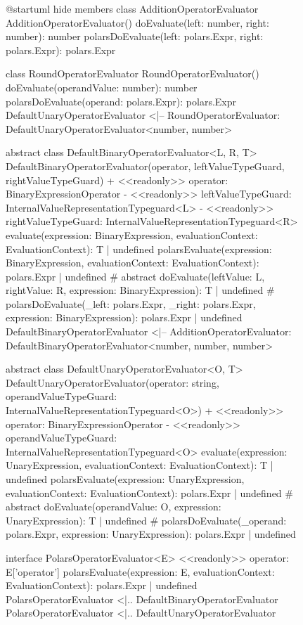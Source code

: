 \begin{figure}
	\begin{plantuml}
		@startuml
		hide members
		class AdditionOperatorEvaluator {
				AdditionOperatorEvaluator()
				doEvaluate(left: number, right: number): number
				polarsDoEvaluate(left: polars.Expr, right: polars.Expr): polars.Expr
			}

		class RoundOperatorEvaluator {
				RoundOperatorEvaluator()
				doEvaluate(operandValue: number): number
				polarsDoEvaluate(operand: polars.Expr): polars.Expr
			}
		DefaultUnaryOperatorEvaluator <|-- RoundOperatorEvaluator: DefaultUnaryOperatorEvaluator<number, number>

		abstract class DefaultBinaryOperatorEvaluator<L, R, T> {
		DefaultBinaryOperatorEvaluator(operator, leftValueTypeGuard, rightValueTypeGuard)
		+ <<readonly>> operator: BinaryExpressionOperator
		- <<readonly>> leftValueTypeGuard: InternalValueRepresentationTypeguard<L>
		- <<readonly>> rightValueTypeGuard: InternalValueRepresentationTypeguard<R>
		evaluate(expression: BinaryExpression, evaluationContext: EvaluationContext): T | undefined
		polarsEvaluate(expression: BinaryExpression, evaluationContext: EvaluationContext): polars.Expr | undefined
		# {abstract} doEvaluate(leftValue: L, rightValue: R, expression: BinaryExpression): T | undefined
		# polarsDoEvaluate(_left: polars.Expr, _right: polars.Expr, expression: BinaryExpression): polars.Expr | undefined
		}
		DefaultBinaryOperatorEvaluator <|-- AdditionOperatorEvaluator: DefaultBinaryOperatorEvaluator<number, number, number>

		abstract class DefaultUnaryOperatorEvaluator<O, T> {
		DefaultUnaryOperatorEvaluator(operator: string, operandValueTypeGuard: InternalValueRepresentationTypeguard<O>)
		+ <<readonly>> operator: BinaryExpressionOperator
		- <<readonly>> operandValueTypeGuard: InternalValueRepresentationTypeguard<O>
		evaluate(expression: UnaryExpression, evaluationContext: EvaluationContext): T | undefined
		polarsEvaluate(expression: UnaryExpression, evaluationContext: EvaluationContext): polars.Expr | undefined
		# {abstract} doEvaluate(operandValue: O, expression: UnaryExpression): T | undefined
		# polarsDoEvaluate(_operand: polars.Expr, expression: UnaryExpression): polars.Expr | undefined
		}

		interface PolarsOperatorEvaluator<E> {
				<<readonly>> operator: E['operator']
				polarsEvaluate(expression: E, evaluationContext: EvaluationContext): polars.Expr | undefined
			}
		PolarsOperatorEvaluator <|.. DefaultBinaryOperatorEvaluator
		PolarsOperatorEvaluator <|.. DefaultUnaryOperatorEvaluator


\end{plantuml}
\end{figure}
